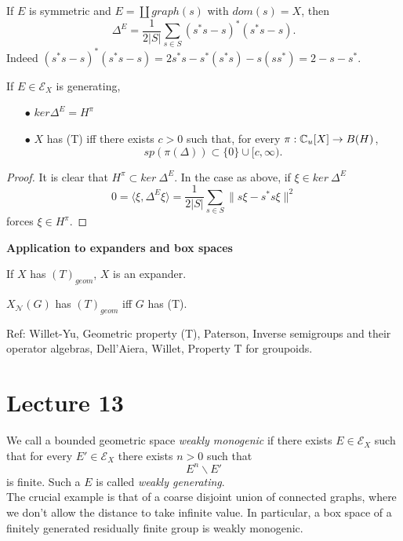 If $E$ is symmetric and $E = \coprod graph(s)$ with $dom(s)=X$, then 
\[\Delta^E = \frac{1}{2|S|}\sum_{s\in S} (s^*s-s)^*(s^*s-s).\]
Indeed $(s^*s-s)^*(s^*s-s)= 2s^*s - s^*(s^* s) -s (ss^*) = 2-s-s^*$.

\begin{prop}
If $E\in \mathcal E_X$ is generating,
\begin{itemize}
\item[$\bullet$] $ker \Delta^E = H^\pi $
\item[$\bullet$] $X$ has (T) iff there exists $c>0$ such that, for every $\pi: \mathbb C_u[X] \rightarrow B(H)$, 
\[sp(\pi(\Delta)) \subset \{0\}\cup [c,\infty).\]
\end{itemize}
\end{prop}

\begin{proof} It is clear that $H^\pi \subset ker \ \Delta^E $. In the case as above, if $\xi \in ker \ \Delta^E$
\[0 = \langle \xi , \Delta^E \xi  \rangle = \frac{1}{2|S|}\sum_{s\in S}  \|s\xi - s^*s \xi\|^2\]
forces $\xi \in H^\pi$.
\end{proof}

\textbf{Application to expanders and box spaces}

\begin{thm}[Willett-Yu]
If $X$ has $(T)_{geom}$, $X$ is an expander.
\end{thm}


\begin{thm}[Willett-Yu]
 $X_{\mathcal N}(G)$ has $(T)_{geom}$ iff $G$ has (T).
\end{thm}

Ref: Willet-Yu, Geometric property (T), Paterson, Inverse semigroups and their operator algebras, Dell'Aiera, Willet, Property T for groupoids.

\section{Lecture 13}

We call a bounded geometric space \textit{weakly monogenic} if there exists $E\in \mathcal E_X$ such that for every $E'\in \mathcal E_X$ there exists $n>0$ such that 
\[E^n \backslash E'\]
is finite. Such a $E$ is called \textit{weakly generating}.\\

The crucial example is that of a coarse disjoint union of connected graphs, where we don't allow the distance to take infinite value. In particular, a box space of a finitely generated residually finite group is weakly monogenic.


